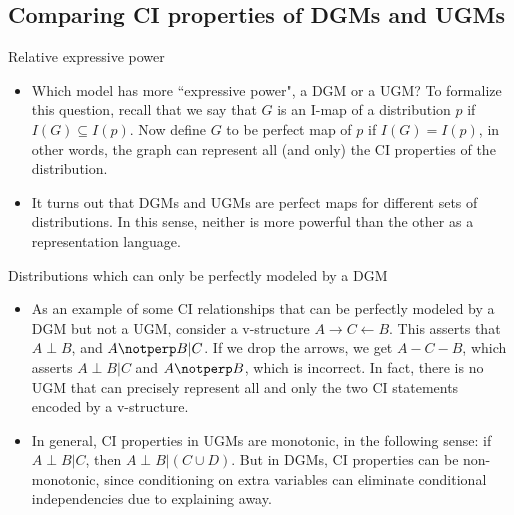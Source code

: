 \documentclass[10pt,mathserif]{beamer}
\begin{document}
        
\subsection{Comparing CI properties of DGMs and UGMs}
\begin{frame}{Relative expressive power}
\begin{itemize}
    \item Which model has more ``expressive power", a DGM or a UGM? To formalize this question, recall that we say that $G$ is an I-map of a distribution $p$ if $I(G) \subseteq I(p)$. Now define $G$ to be perfect map of $p$ if $I(G) = I(p)$, in other words, the graph can represent all (and only) the CI properties of the distribution.
    \item It turns out that DGMs and UGMs are perfect maps for different sets of distributions. In this sense, neither is more powerful than the other as a representation language.
\end{itemize}
\end{frame}

\begin{frame}{Distributions which can only be perfectly modeled by a DGM}
\begin{itemize}
    \item As an example of some CI relationships that can be perfectly modeled by a DGM but not a UGM, consider a v-structure $A \rightarrow C \leftarrow B$. This asserts that $A \perp B$, and $A \notperp B|C$. If we drop the arrows, we get $A - C - B$, which asserts $A \perp B|C$ and $A \notperp B$, which is incorrect. In fact, there is no UGM that can precisely represent all and only the two CI statements encoded by a v-structure.
    \item In general, CI properties in UGMs are monotonic, in the following sense: if $A \perp B|C$, then $A \perp B|(C \cup D)$. But in DGMs, CI properties can be non-monotonic, since conditioning on extra variables can eliminate conditional independencies due to explaining away.
\end{itemize}
\end{frame}
        
\end{document}

